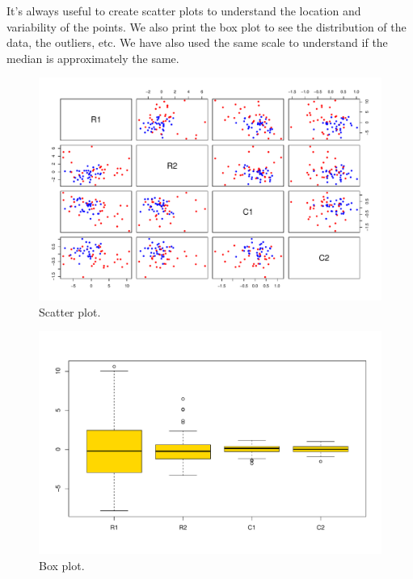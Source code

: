 \documentclass[a4paper]{article}
\begin{document}
    \noindent
    It's always useful to create scatter plots to understand the location and variability of the points. We also print the box plot to see the distribution of the data, the outliers, etc. We have also used the same scale to understand if the median is approximately the same.
    
    \begin{figure}[!htp]
        \centering
        \includegraphics[width=\textwidth]{img/visualization-of-multivariate-data-9.pdf}
        \caption*{Scatter plot.}
    \end{figure}

    \begin{figure}[!htp]
        \centering
        \includegraphics[width=\textwidth]{img/visualization-of-multivariate-data-10.pdf}
        \caption*{Box plot.}
    \end{figure}
\end{document}
